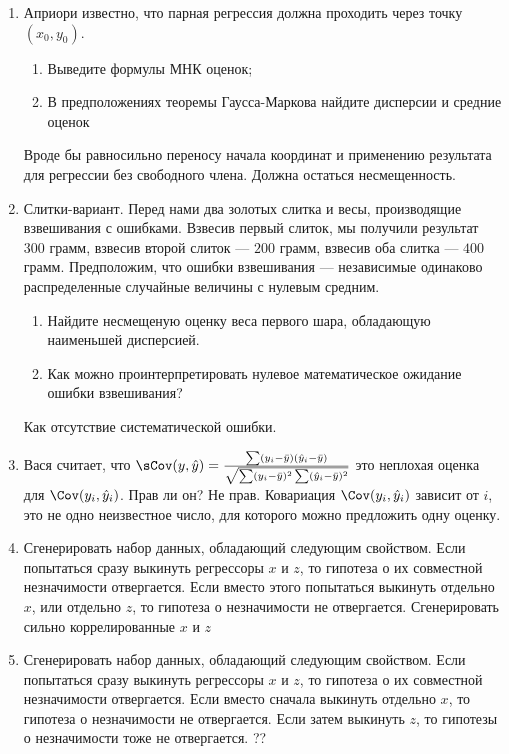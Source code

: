 \documentclass[pdftex,12pt,a4paper]{article}
\def \hy{\hat{y}}
\newcommand{\solution}[1]{ {\tiny #1} }
\newcommand{\problem}[1]{#1}
\begin{document}
\begin{enumerate}
\item Априори известно, что парная регрессия должна проходить через точку $(x_{0},y_{0})$.
\begin{enumerate}
\item  Выведите формулы МНК оценок;
\item В предположениях теоремы Гаусса-Маркова найдите дисперсии и средние оценок 
\end{enumerate}

\solution{Вроде бы равносильно переносу начала координат и применению результата для регрессии без свободного члена. Должна остаться несмещенность. }




\item \problem{ Слитки-вариант. Перед нами два золотых слитка и весы, производящие взвешивания с ошибками. Взвесив первый слиток, мы получили результат $300$ грамм, взвесив второй слиток --- $200$ грамм, взвесив оба слитка --- $400$ грамм. Предположим, что ошибки взвешивания --- независимые одинаково распределенные случайные величины с нулевым средним. 
\begin{enumerate}
\item Найдите несмещеную оценку веса первого шара, обладающую наименьшей дисперсией.
\item Как можно проинтерпретировать нулевое математическое ожидание ошибки взвешивания? 
\end{enumerate} }
\solution{ Как отсутствие систематической ошибки.} 

\item Вася считает, что $\sCov(y,\hy)=\frac{\sum (y_i-\bar{y})(\hy_i-\bar{y})}{\sqrt{\sum (y_i-\bar{y})^2 \sum (\hy_i-\bar{y})^2}}$ это неплохая оценка для $\Cov(y_i,\hy_i)$. Прав ли он?
\solution{Не прав. Ковариация $\Cov(y_i,\hy_i)$ зависит от $i$, это не одно неизвестное число, для которого можно предложить одну оценку.}


\item Сгенерировать набор данных, обладающий следующим свойством. Если попытаться сразу выкинуть регрессоры $x$ и $z$, то гипотеза о их совместной незначимости отвергается. Если вместо этого попытаться выкинуть отдельно $x$, или отдельно $z$, то гипотеза о незначимости не отвергается.
\solution{Сгенерировать сильно коррелированные $x$ и $z$}


\item Сгенерировать набор данных, обладающий следующим свойством. Если попытаться сразу выкинуть регрессоры $x$ и $z$, то гипотеза о их совместной незначимости отвергается. Если вместо сначала выкинуть отдельно $x$, то гипотеза о незначимости не отвергается. Если затем выкинуть $z$, то гипотезы о незначимости тоже не отвергается.
\solution{??}


\end{enumerate}
\end{document}
